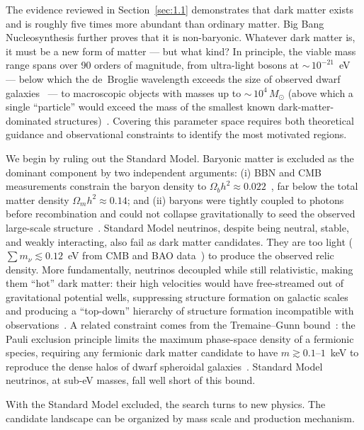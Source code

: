 The evidence reviewed in Section~\ref{sec:1.1} demonstrates that dark matter exists and is roughly five times more abundant than ordinary matter.
Big Bang Nucleosynthesis further proves that it is non-baryonic.
Whatever dark matter is, it must be a new form of matter --- but what kind?
In principle, the viable mass range spans over 90 orders of magnitude, from ultra-light bosons at ${\sim}\,10^{-21}$~eV --- below which the de~Broglie wavelength exceeds the size of observed dwarf galaxies~\cite{Hu:2000ke} --- to macroscopic objects with masses up to ${\sim}\,10^{4}\,M_\odot$ (above which a single ``particle'' would exceed the mass of the smallest known dark-matter-dominated structures)~\cite{Cirelli:2024ssz}.
Covering this parameter space requires both theoretical guidance and observational constraints to identify the most motivated regions.

We begin by ruling out the Standard Model.
Baryonic matter is excluded as the dominant component by two independent arguments: (i) BBN and CMB measurements constrain the baryon density to $\Omega_b h^2 \approx 0.022$~\cite{Aghanim:2018eyx,Cirelli:2024ssz}, far below the total matter density $\Omega_m h^2 \approx 0.14$; and (ii) baryons were tightly coupled to photons before recombination and could not collapse gravitationally to seed the observed large-scale structure~\cite{Cirelli:2024ssz}.
Standard Model neutrinos, despite being neutral, stable, and weakly interacting, also fail as dark matter candidates.
They are too light ($\sum m_\nu \lesssim 0.12$~eV from CMB and BAO data~\cite{Cirelli:2024ssz}) to produce the observed relic density.
More fundamentally, neutrinos decoupled while still relativistic, making them ``hot'' dark matter: their high velocities would have free-streamed out of gravitational potential wells, suppressing structure formation on galactic scales and producing a ``top-down'' hierarchy of structure formation incompatible with observations~\cite{Cirelli:2024ssz}.
A related constraint comes from the Tremaine--Gunn bound~\cite{Tremaine:1979we}: the Pauli exclusion principle limits the maximum phase-space density of a fermionic species, requiring any fermionic dark matter candidate to have $m \gtrsim 0.1$--$1$~keV to reproduce the dense halos of dwarf spheroidal galaxies~\cite{Cirelli:2024ssz}.
Standard Model neutrinos, at sub-eV masses, fall well short of this bound.

With the Standard Model excluded, the search turns to new physics.
The candidate landscape can be organized by mass scale and production mechanism.


